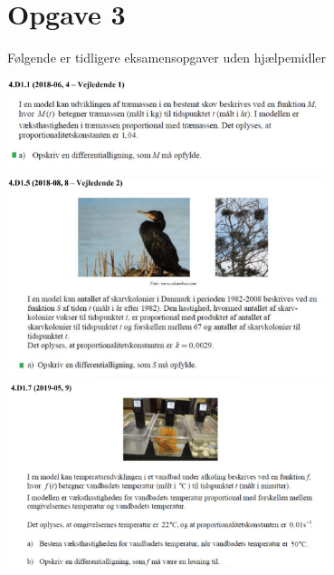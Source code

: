 \section*{Opgave 3}
Følgende er tidligere eksamensopgaver uden hjælpemidler
\begin{center}
	\includegraphics[width=0.7\textwidth]{Billeder/sprogligdiff1.jpg}
	\includegraphics[width=0.7\textwidth]{Billeder/sprogligdiff2.jpg}
	\includegraphics[width=0.7\textwidth]{Billeder/sprogligdiff3.jpg}
\end{center}